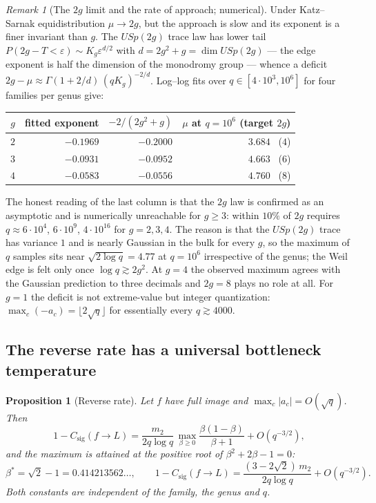 \documentclass[11pt]{article}
\theoremstyle{definition}
\theoremstyle{plain}
\newtheorem{proposition}[definition]{Proposition}
\theoremstyle{remark}
\newtheorem{remark}[definition]{Remark}
\newcommand{\csig}{C_{\mathrm{sig}}}
\begin{document}
\begin{remark}[The \(2g\) limit and the rate of approach; numerical]
\label{rem:extreme-value}
Under Katz--Sarnak equidistribution \(\mu\to2g\), but the approach is slow and
its exponent is a finer invariant than \(g\).  The \(USp(2g)\) trace law has
lower tail \(P(2g-T<\varepsilon)\sim K_g\varepsilon^{d/2}\) with
\(d=2g^2+g=\dim USp(2g)\) --- the edge exponent is half the dimension of the
monodromy group --- whence a deficit
\(2g-\mu\approx\Gamma(1+2/d)\,(qK_g)^{-2/d}\).  Log--log fits over
\(q\in[4\cdot10^3,10^6]\) for four families per genus give:
\begin{center}
\begin{tabular}{@{}rrrr@{}}
\toprule
\(g\) & fitted exponent & \(-2/(2g^2+g)\) & \(\mu\) at \(q=10^6\) (target \(2g\))\\
\midrule
\(2\) & \(-0.1969\) & \(-0.2000\) & \(3.684\) \ (\(4\))\\
\(3\) & \(-0.0931\) & \(-0.0952\) & \(4.663\) \ (\(6\))\\
\(4\) & \(-0.0583\) & \(-0.0556\) & \(4.760\) \ (\(8\))\\
\bottomrule
\end{tabular}
\end{center}
The honest reading of the last column is that the \(2g\) law is confirmed as an
asymptotic and is numerically unreachable for \(g\ge3\): within \(10\%\) of
\(2g\) requires \(q\approx6\cdot10^4\), \(6\cdot10^9\), \(4\cdot10^{16}\) for
\(g=2,3,4\).  The reason is that the \(USp(2g)\) trace has variance \(1\) and
is nearly Gaussian in the bulk for every \(g\), so the maximum of \(q\) samples
sits near \(\sqrt{2\log q}=4.77\) at \(q=10^6\) irrespective of the genus; the
Weil edge is felt only once \(\log q\gtrsim2g^2\).  At \(g=4\) the observed
maximum agrees with the Gaussian prediction to three decimals and \(2g=8\)
plays no role at all.  For \(g=1\) the deficit is not extreme-value but integer
quantization: \(\max_c(-a_c)=\lfloor2\sqrt q\rfloor\) for essentially every
\(q\gtrsim4000\).
\end{remark}

\subsection{The reverse rate has a universal bottleneck temperature}

\begin{proposition}[Reverse rate]
\label{prop:reverse}
Let \(f\) have full image and \(\max_c|a_c|=O(\sqrt q)\).  Then
\[
  1-\csig(f\to L)
  =\frac{m_2}{2q\log q}\,
    \max_{\beta\ge0}\frac{\beta(1-\beta)}{\beta+1}
  +O(q^{-3/2}),
\]
and the maximum is attained at the positive root of \(\beta^2+2\beta-1=0\):
\begin{equation}
  \beta^*=\sqrt2-1=0.414213562\ldots,
  \qquad
  1-\csig(f\to L)=\frac{(3-2\sqrt2)\,m_2}{2q\log q}+O(q^{-3/2}).
  \label{eq:beta-star}
\end{equation}
Both constants are independent of the family, the genus and \(q\).
\end{proposition}
\end{document}
